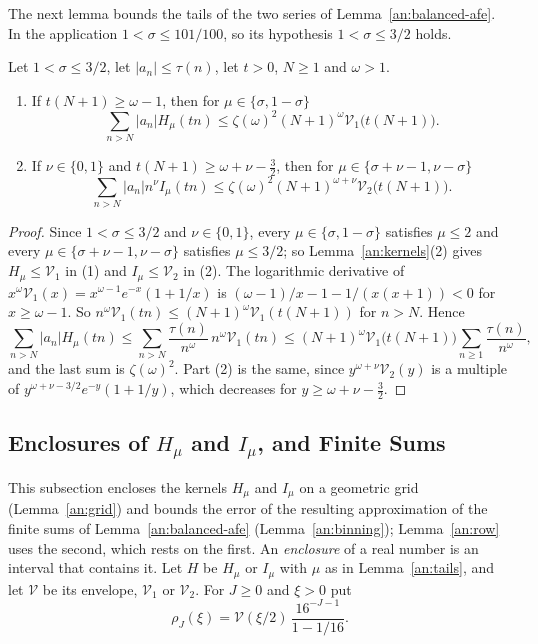 The next lemma bounds the tails of the two series of
Lemma~\ref{an:balanced-afe}. In the application $1<\sigma\le101/100$, so its
hypothesis $1<\sigma\le3/2$ holds.


\begin{lemma}\label{an:tails}
Let $1<\sigma\le3/2$, let $|a_n|\le\tau(n)$, let $t>0$, $N\ge1$ and
$\omega>1$.
\begin{enumerate}
\item If $t(N+1)\ge\omega-1$, then for $\mu\in\{\sigma,1-\sigma\}$
\[
 \sum_{n>N}|a_n|H_\mu(tn)\le\zeta(\omega)^2(N+1)^\omega
 \mathcal V_1\bigl(t(N+1)\bigr).
\]
\item If $\nu\in\{0,1\}$ and $t(N+1)\ge\omega+\nu-\frac32$, then for
 $\mu\in\{\sigma+\nu-1,\nu-\sigma\}$
\[
 \sum_{n>N}|a_n|n^\nu I_\mu(tn)\le\zeta(\omega)^2(N+1)^{\omega+\nu}
 \mathcal V_2\bigl(t(N+1)\bigr).
\]
\end{enumerate}
\end{lemma}

\begin{proof}
Since $1<\sigma\le3/2$ and $\nu\in\{0,1\}$, every $\mu\in\{\sigma,1-\sigma\}$
satisfies $\mu\le2$ and every $\mu\in\{\sigma+\nu-1,\nu-\sigma\}$ satisfies
$\mu\le3/2$; so Lemma~\ref{an:kernels}(2) gives $H_\mu\le\mathcal V_1$ in (1)
and $I_\mu\le\mathcal V_2$ in (2). The logarithmic derivative of
$x^\omega\mathcal V_1(x)=x^{\omega-1}e^{-x}(1+1/x)$ is
$(\omega-1)/x-1-1/(x(x+1))<0$ for $x\ge\omega-1$. So
$n^\omega\mathcal V_1(tn)\le(N+1)^\omega\mathcal V_1(t(N+1))$ for $n>N$.
Hence
\[
 \sum_{n>N}|a_n|H_\mu(tn)\le\sum_{n>N}\frac{\tau(n)}{n^\omega}\,
 n^\omega\mathcal V_1(tn)\le(N+1)^\omega\mathcal V_1\bigl(t(N+1)\bigr)
 \sum_{n\ge1}\frac{\tau(n)}{n^\omega},
\]
and the last sum is $\zeta(\omega)^2$. Part (2) is the same, since
$y^{\omega+\nu}\mathcal V_2(y)$ is a multiple of
$y^{\omega+\nu-3/2}e^{-y}(1+1/y)$, which decreases for
$y\ge\omega+\nu-\frac32$.
\end{proof}

\subsection{\texorpdfstring{Enclosures of $H_\mu$ and $I_\mu$, and Finite Sums}{Enclosures of H and I, and Finite Sums}}
\label{an:kernel-enclosures}
This subsection encloses the kernels $H_\mu$ and $I_\mu$ on a geometric grid
(Lemma~\ref{an:grid}) and bounds the error of the resulting approximation of
the finite sums of Lemma~\ref{an:balanced-afe} (Lemma~\ref{an:binning});
Lemma~\ref{an:row} uses the second, which rests on the first. An \emph{enclosure} of a real number is an
interval that contains it. Let $H$ be $H_\mu$ or $I_\mu$
with $\mu$ as in Lemma~\ref{an:tails}, and let $\mathcal V$ be its envelope,
$\mathcal V_1$ or $\mathcal V_2$. For $J\ge0$ and $\xi>0$ put
\[
 \rho_J(\xi)=\mathcal V(\xi/2)\,\frac{16^{-J-1}}{1-1/16}.
\]

